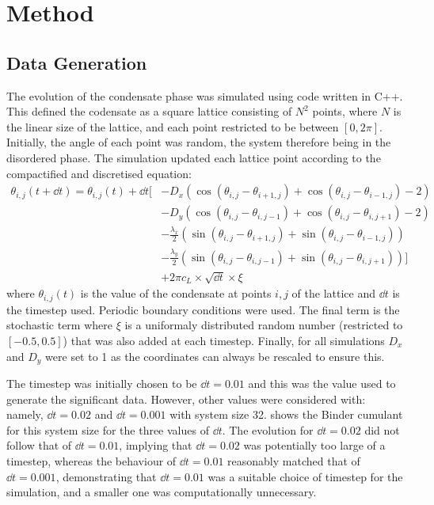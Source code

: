 \chapter{Method} 
\section{Data Generation}

The evolution of the condensate phase was simulated using code written in C++. This defined the codensate as a square lattice consisting of $N^2$ points, where $N$ is the linear size of the lattice, and each point restricted to be between $[0, 2 \pi]$. Initially, the angle of each point was random, the system therefore being in the disordered phase. The simulation updated each lattice point according to the compactified and discretised equation:
\[
\begin{split}
\theta_{i,j}(t +\dd{t}) = \theta_{i,j}(t) +  \dd{t}[&- D_x ( \cos(\theta_{i,j} - \theta_{i+1,j}) + \cos( \theta_{i,j} - \theta_{i-1,j}) - 2)\\
 					&- D_y(\cos(\theta_{i,j} - \theta_{i,j-1}) + \cos(\theta_{i,j} - \theta_{i,j+1}) - 2) \\
					& -\frac{\lambda_x}{2}(\sin(\theta_{i,j} - \theta_{i+1,j}) + \sin( \theta_{i,j} - \theta_{i-1,j}) ) \\ 
					& -\frac{\lambda_y}{2}(\sin(\theta_{i,j} - \theta_{i,j-1}) + \sin(\theta_{i,j} - \theta_{i,j+1}))] \\
					& +2\pi c_L \times \sqrt{\dd{t}} \times \xi 
\end{split}
\]
where $\theta_{i,j}(t)$ is the value of the condensate at points $i,j$ of the lattice and $\dd{t}$ is the timestep used. Periodic boundary conditions were used. The final term is the stochastic term where $\xi$ is a uniformaly distributed random number (restricted to $[-0.5, 0.5]$) that was also added at each timestep. Finally, for all simulations $D_x$ and $D_y$ were set to 1 as the coordinates can always be rescaled to ensure this.  

The timestep was initially chosen to be $\dd{t}=0.01$ and this was the value used to generate the significant data. However, other values were considered with: namely, $\dd{t} = 0.02$ and $\dd{t} = 0.001$ with system size 32. \fig{\ref{fig:binder_different_cL}} shows the Binder cumulant for this system size for the three values of $\dd{t}$. The evolution for $\dd{t}=0.02$  did not follow that of $\dd{t}=0.01$, implying that $\dd{t}=0.02$ was potentially too large of a timestep, whereas the behaviour of $\dd{t}=0.01$ reasonably matched that of $\dd{t}=0.001$, demonstrating that $\dd{t}=0.01$ was a suitable choice of timestep for the simulation, and a smaller one was computationally unnecessary. 


